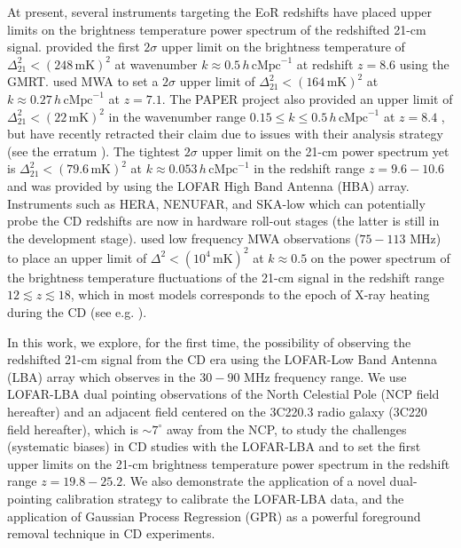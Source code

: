 \documentclass[fleqn,usenatbib]{mnras}
\begin{document}
At present, several instruments targeting the EoR redshifts have placed upper limits on the brightness temperature power spectrum of the redshifted 21-cm signal. \cite{paciga2013} provided the first $2\sigma$ upper limit on the brightness temperature of $\Delta_{21}^2 < (248\,\text{mK})^2$ at wavenumber $k \approx 0.5\,h\,\text{cMpc}^{-1}$ at redshift $z=8.6$ using the GMRT. \cite{beardsley2016} used MWA to set a $2\sigma$ upper limit of $\Delta_{21}^2 < (164\,\text{mK})^2$ at $k \approx 0.27\,h\,\text{cMpc}^{-1}$ at $z=7.1$. The PAPER project also provided an upper limit of $\Delta_{21}^2 < (22\,\text{mK})^2$ in the wavenumber range $0.15 \leq k \leq 0.5\,h\,\text{cMpc}^{-1}$ at $z=8.4$ \citep{ali2015}, but have recently retracted their claim due to  issues with their analysis strategy (see the erratum \citealt{ali2018}). The tightest $2\sigma$ upper limit on the 21-cm power spectrum yet is $\Delta_{21}^2 < (79.6\,\text{mK})^2$ at $k \approx 0.053\,h\,\text{cMpc}^{-1}$ in the redshift range $z= 9.6 -10.6$ and was provided by \cite{patil2017} using the LOFAR High Band Antenna (HBA) array. Instruments such as HERA, NENUFAR, and SKA-low which can potentially probe the CD redshifts are now in hardware roll-out stages (the latter is still in the development stage). \cite{ewall-wice2016} used low frequency MWA observations ($75-113$ MHz) to place an upper limit of $\Delta^2 < (10^4\,\text{mK})^2$ at $k\approx 0.5$ on the power spectrum of the brightness temperature fluctuations of the 21-cm signal in the redshift range $12\lesssim z \lesssim 18$, which in most models corresponds to the epoch of X-ray heating during the CD (see e.g. \citealt{glover2003,fialkov2014,ross2017}). 

In this work, we explore, for the first time, the possibility of observing the redshifted 21-cm signal from the CD era using the LOFAR-Low Band Antenna (LBA) array which observes in the $30-90$ MHz frequency range. We use LOFAR-LBA dual pointing observations of the North Celestial Pole (NCP field hereafter) and an adjacent field centered on the 3C220.3 radio galaxy (3C220 field hereafter), which is $\sim 7^{\circ}$ away from the NCP, to study the challenges (systematic biases) in CD studies with the LOFAR-LBA and to set the first upper limits on the 21-cm brightness temperature power spectrum in the redshift range $z = 19.8 - 25.2$. We also demonstrate the application of a novel dual-pointing calibration strategy to calibrate the LOFAR-LBA data, and the application of Gaussian Process Regression (GPR) as a powerful foreground removal technique in CD experiments. 
\end{document}
